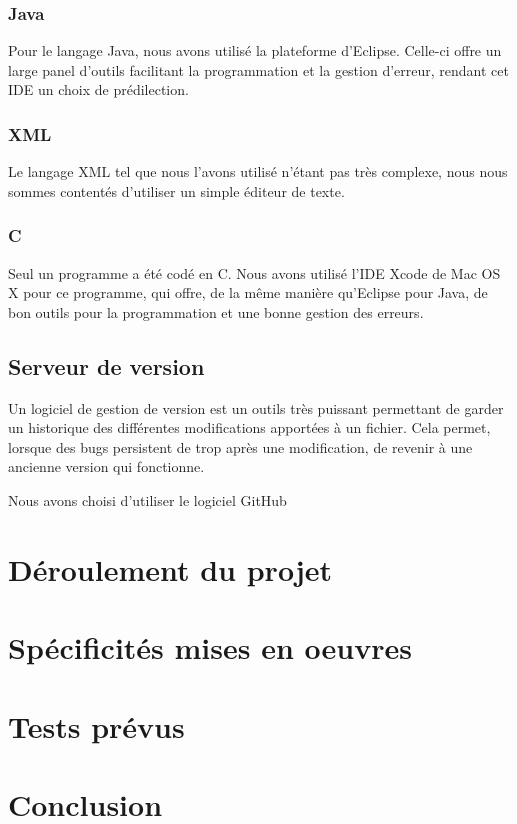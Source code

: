 		\subsection{Java}
		Pour le langage Java, nous avons utilisé la plateforme d'Eclipse. Celle-ci offre un large panel d'outils facilitant la programmation et la gestion d'erreur, rendant cet IDE un choix de prédilection.
		
		\subsection{XML}
		Le langage XML tel que nous l'avons utilisé n'étant pas très complexe, nous nous sommes contentés d'utiliser un simple éditeur de texte.
	
		\subsection{C} 
		Seul un programme a été codé en C. Nous avons utilisé l'IDE Xcode de Mac OS X pour ce programme, qui offre, de la même manière qu'Eclipse pour Java, de bon outils pour la programmation et une bonne gestion des erreurs.
		
		
		
		\section{Serveur de version}
		
		Un logiciel de gestion de version est un outils très puissant permettant de garder un historique des différentes modifications apportées à un fichier. Cela permet, lorsque des bugs persistent de trop après une modification, de revenir à une ancienne version qui fonctionne.
		
		Nous avons choisi d'utiliser le logiciel GitHub

		\chapter{Déroulement du projet}

		\chapter{Spécificités mises en oeuvres}

		\chapter{Tests prévus}

		\chapter{Conclusion}
		
		
		
		
		
		
		
		
		
		
		
		
		
		
		
		
		
		
		
		